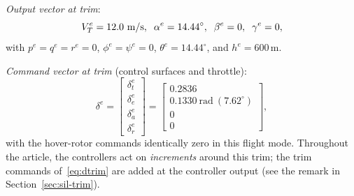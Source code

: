 \emph{Output vector at trim}:
\begin{equation}
\label{eq:ytrim}
V_T^e = 12.0~\text{m/s},\;\;
\alpha^e = 14.44^\circ,\;\;
\beta^e = 0,\;\;
\gamma^e = 0,
\end{equation}
with $p^e=q^e=r^e=0$, $\phi^e=\psi^e=0$, $\theta^e=14.44^\circ$, and
$h^e=600$\,m.

\emph{Command vector at trim} (control surfaces and throttle):
\begin{equation}
\label{eq:dtrim}
\delta^e =
\begin{bmatrix}
\delta_{t}^{e} \\ \delta_{e}^{e} \\ \delta_{a}^{e} \\ \delta_{r}^{e}
\end{bmatrix}
=
\begin{bmatrix}
0.2836 \\ 0.1330~\text{rad}~(7.62^\circ) \\ 0 \\ 0
\end{bmatrix},
\end{equation}
with the hover-rotor commands identically zero in this flight mode.
Throughout the article, the controllers act on \emph{increments} around
this trim; the trim commands of~\eqref{eq:dtrim} are added at the
controller output (see the remark in Section~\ref{sec:sil-trim}).

